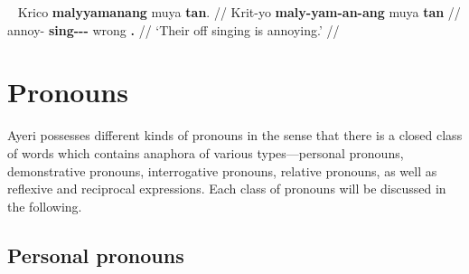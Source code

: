 \ex~\begingl
	\gla Krico \textbf{malyyamanang} muya \textbf{tan}. //
	\glb Krit-yo \textbf{maly-yam-an-ang} muya \textbf{tan} //
	\glc annoy-\TsgN{} \textbf{sing-\Ptcp{}-\Nmlz{}-\Aarg{}} wrong 
		\textbf{\TplM{}.\Gen{}} //
	\glft `Their off singing is annoying.' //
\endgl\xe



\section{Pronouns}

Ayeri possesses different kinds of pronouns in the sense that there is a closed 
class of words which contains anaphora of various types---personal pronouns, 
demonstrative pronouns, interrogative pronouns, relative pronouns, as 
well as reflexive and reciprocal expressions. Each class of pronouns will be 
discussed in the following.

\subsection{Personal pronouns}
\label{subsec:perspro}

